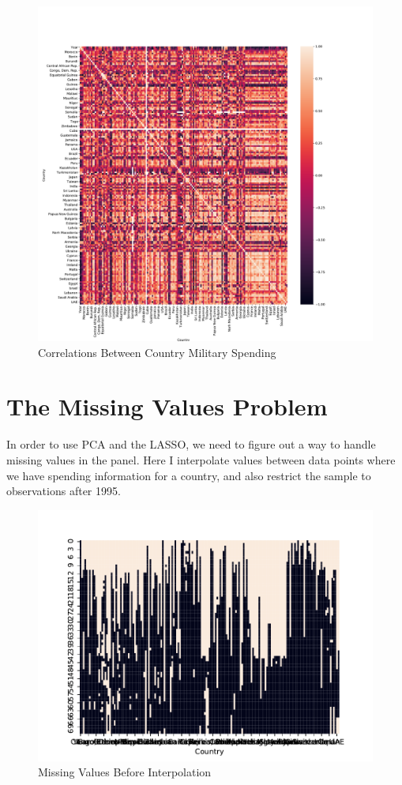 \documentclass{report}
\begin{document}
	\begin{figure}[h!]
		\centering
		\caption{Correlations Between Country Military Spending}
		\label{Milex_Correlations}	
		\includegraphics[width=\linewidth,keepaspectratio=true]{../Output/Figures/Milex_Correlations.pdf}
	\end{figure}

    \section*{The Missing Values Problem}

    In order to use PCA and the LASSO, we need to figure out a way to handle missing values in the panel. Here I interpolate values between data points where we have spending information for a country, and also restrict the sample to observations after 1995.

	\begin{figure}[h!]
		\centering
		\caption{Missing Values Before Interpolation}
		\label{SIPRI_Missing_Values}	
		\includegraphics[width=\linewidth,keepaspectratio=true]{../Output/Figures/SIPRI_Missing_Values.pdf}
	\end{figure}
\end{document}
